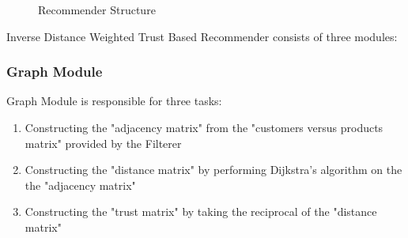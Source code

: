 \label{inverse_section}
	\begin{figure}[H]
		\centering
		\caption{Recommender Structure}
		\label{fig:inverse_structure}
	\end{figure}
	Inverse Distance Weighted Trust Based Recommender consists of three modules:
	
	\subsubsection{Graph Module} Graph Module is responsible for three tasks:
	\begin{enumerate}
		\item Constructing the "adjacency matrix" from the "customers versus products matrix" provided by the Filterer
		\item Constructing the "distance matrix" by performing Dijkstra's algorithm on the the "adjacency matrix"
		\item Constructing the "trust matrix" by taking the reciprocal of the "distance matrix"
	\end{enumerate}
